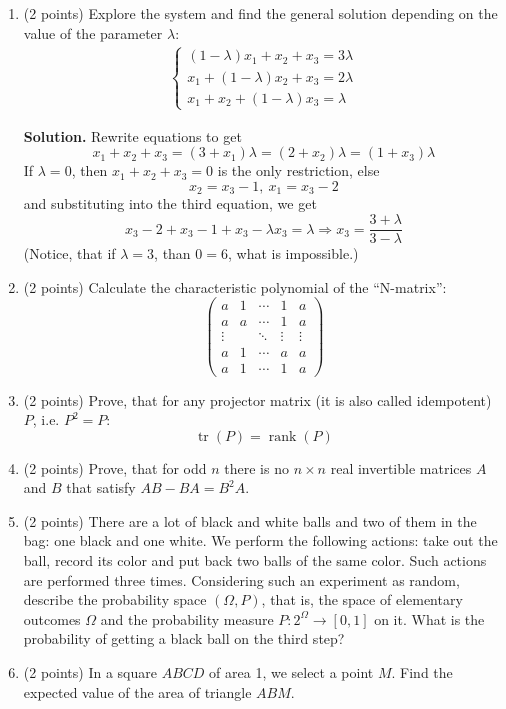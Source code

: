 \documentclass{article}
\begin{document}
\begin{enumerate}
  \item (2 points) Explore the system and find the general solution depending on the value of the parameter $\lambda$:
  \begin{align*}
    \begin{cases}
      (1 - \lambda)x_1 + x_2 + x_3 = 3\lambda \\
      x_1 + (1 - \lambda)x_2 + x_3 = 2\lambda \\
      x_1 + x_2 + (1 - \lambda)x_3 = \lambda
    \end{cases}
  \end{align*}

  \textbf{Solution.} Rewrite equations to get 
  $$ x_1 + x_2 + x_3 = (3+x_1)\lambda = (2+x_2)\lambda = (1+x_3)\lambda$$
  If $\lambda = 0$, then $x_1 + x_2 + x_3 = 0$ is the only restriction, else
  $$ x_2 = x_3-1,\ x_1 = x_3-2 $$
  and substituting into the third equation, we get
  $$ x_3-2 + x_3-1 + x_3 - \lambda x_3 = \lambda \Rightarrow x_3 = \frac{3+\lambda}{3-\lambda} $$
  (Notice, that if $\lambda = 3$, than $0 = 6$, what is impossible.)

  \item (2 points) Calculate the characteristic polynomial of the ``N-matrix'':
  \[
    \begin{pmatrix}
      a & 1 & \cdots & 1 & a \\
      a & a & \cdots & 1 & a \\
      \vdots &  & \ddots & \vdots & \vdots \\
      a & 1 & \cdots & a & a \\
      a & 1 & \cdots & 1 & a
      \end{pmatrix}  \]  

  \item (2 points) Prove, that for any projector matrix (it is also called idempotent) $P$, i.e. $P^2 = P$:
   $$ \operatorname{tr} (P) = \operatorname{rank} (P)$$

  \item (2 points) Prove, that for odd $n$ there is no $n \times n$ real invertible 
  matrices $A$ and $B$ that satisfy $AB - BA = B^2A$.

  \item (2 points) There are a lot of black and white balls and 
  two of them in the bag: one black and one white. 
  We perform the following actions: take out the ball, 
  record its color and put back two balls of the same color. 
  Such actions are performed three times. Considering such 
  an experiment as random, describe the probability space $(\Omega, P)$, 
  that is, the space of elementary outcomes $\Omega$ and 
  the probability measure $P: 2^{\Omega} \rightarrow [0, 1]$ on it. 
  What is the probability of getting a black ball on the third step?

  \item (2 points) In a square $ABCD$ of area 1, we select a point $M$. 
  Find the expected value of the area of triangle $ABM$.

\end{enumerate}
\end{document}
